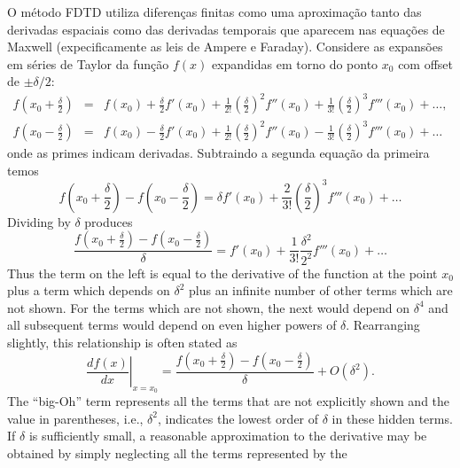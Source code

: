 O método FDTD utiliza diferenças finitas como uma aproximação tanto 
das derivadas espaciais como das derivadas temporais que aparecem nas equações de 
Maxwell (expecificamente as leis de Ampere e Faraday). Considere as 
expansões em séries de Taylor da função $f(x)$ expandidas em torno do 
ponto $x_0$ com offset de $\pm\delta/2$:
\begin{eqnarray}
  f\!\left(x_0+\frac{\delta}{2}\right) &=&
    f(x_0) + \frac{\delta}{2} f'(x_0) +
        \frac{1}{2!}\left(\frac{\delta}{2}\right)^2 f''(x_0) + 
        \frac{1}{3!}\left(\frac{\delta}{2}\right)^3 f'''(x_0) + \ldots,
  \\
  f\!\left(x_0-\frac{\delta}{2}\right) &=&
    f(x_0) - \frac{\delta}{2} f'(x_0) +
        \frac{1}{2!}\left(\frac{\delta}{2}\right)^2 f''(x_0) -
        \frac{1}{3!}\left(\frac{\delta}{2}\right)^3 f'''(x_0) + \ldots
\end{eqnarray}
onde as primes indicam derivadas. Subtraindo a segunda 
equação da primeira temos
\begin{equation}
  f\!\left(x_0+\frac{\delta}{2}\right) -
  f\!\left(x_0-\frac{\delta}{2}\right) = 
   \delta f'(x_0) +
        \frac{2}{3!}\left(\frac{\delta}{2}\right)^3 f'''(x_0) + \ldots
\end{equation}
Dividing by $\delta$ produces
\begin{equation}
  \frac{f\!\left(x_0+\frac{\delta}{2}\right) -
        f\!\left(x_0-\frac{\delta}{2}\right)}{\delta} = 
   f'(x_0) +
        \frac{1}{3!}\frac{\delta^2}{2^2} f'''(x_0) + \ldots
\end{equation}
Thus the term on the left is equal to the derivative of the function
at the point $x_0$ plus a term which depends on $\delta^2$ plus an
infinite number of other terms which are not shown.  For the terms
which are not shown, the next would depend on $\delta^4$ and all
subsequent terms would depend on even higher powers of $\delta$.
Rearranging slightly, this relationship is often stated as
\begin{equation}
  \left.\frac{df(x)}{dx}\right|_{x=x_0} = 
  \frac{f\!\left(x_0+\frac{\delta}{2}\right) -
        f\!\left(x_0-\frac{\delta}{2}\right)}{\delta} + O(\delta^2).
\end{equation}
The ``big-Oh'' term represents all the terms that are not explicitly
shown and the value in parentheses, i.e., $\delta^2$, indicates the
lowest order of $\delta$ in these hidden terms.  If $\delta$ is
sufficiently small, a reasonable approximation to the derivative may
be obtained by simply neglecting all the terms represented by the
